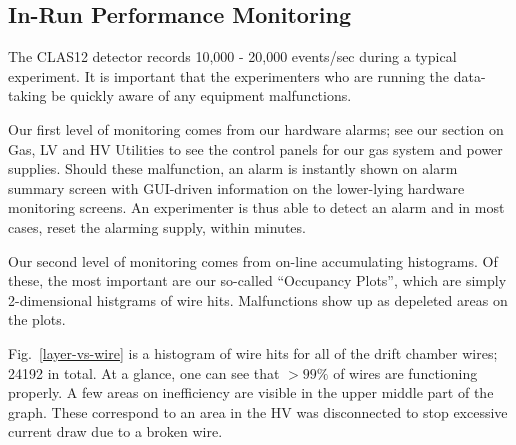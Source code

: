 \subsection{In-Run Performance Monitoring}
The CLAS12 detector records 10,000 - 20,000 events/sec during a typical experiment.
It is important that the experimenters who are running the data-taking be quickly
aware of any equipment malfunctions.

Our first level of monitoring comes from our hardware alarms; see our section on
Gas, LV and HV Utilities to see the control panels for our gas system and power
supplies.  Should these malfunction, an alarm is instantly shown on alarm summary
screen with GUI-driven information on the lower-lying hardware monitoring screens.
An experimenter is thus able to detect an alarm and in most cases, reset the
alarming supply, within minutes.

Our second level of monitoring comes from on-line accumulating histograms.
Of these, the most important are our so-called ``Occupancy Plots'', which
are simply 2-dimensional histgrams of wire hits.  Malfunctions show up
as depeleted areas on the plots.

Fig.~\ref{layer-vs-wire} is a histogram of wire hits for all of
the drift chamber wires; 24192 in total.  At a glance, one can see
that $>99\%$ of wires are functioning properly.  A few areas on inefficiency
are visible in the upper middle part of the graph.  These correspond to
an area in the HV was disconnected to stop excessive current draw due
to a broken wire.


